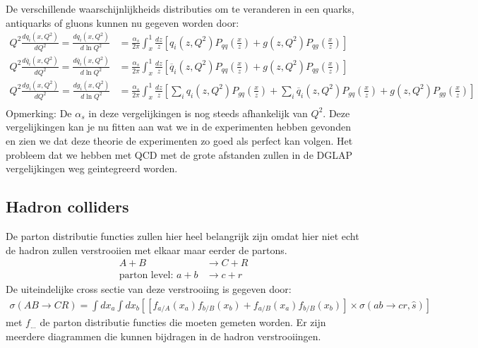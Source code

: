 \documentclass[../main.tex]{subfiles}
\begin{document}
De verschillende waarschijnlijkheids distributies om te veranderen in een  quarks, antiquarks of gluons kunnen nu gegeven worden door:
\begin{equation}
    \begin{aligned}
        \label{eq:dglap}
        Q^2 \frac{dq_i(x, Q^2)}{dQ^2} = \frac{dq_i(x,Q^2)}{d\ln Q^2} &= \frac{\alpha_s}{2\pi} \int_x^1 \frac{dz}{z} \left[ q_i(z,Q^2)P_{qq}\left( \frac{x}{z} \right) + g(z,Q^2)P_{qg} \left( \frac{x}{z} \right) \right]\\
        Q^2 \frac{d\overline q_i(x, Q^2)}{dQ^2} = \frac{d\overline q_i(x,Q^2)}{d\ln Q^2} &= \frac{\alpha_s}{2\pi} \int_x^1 \frac{dz}{z} \left[ \overline q_i(z,Q^2)P_{qq}\left( \frac{x}{z} \right) + g(z,Q^2)P_{qg} \left( \frac{x}{z} \right) \right]\\
        Q^2 \frac{dg_i(x, Q^2)}{dQ^2} = \frac{dg_i(x,Q^2)}{d\ln Q^2} &= \frac{\alpha_s}{2\pi} \int_x^1 \frac{dz}{z} \left[ \sum_i q_i(z,Q^2)P_{gq}\left( \frac{x}{z} \right) + \sum_i \overline q_i(z,Q^2)P_{gq}\left( \frac{x}{z} \right) + g(z,Q^2)P_{gg} \left( \frac{x}{z} \right) \right]\\
    \end{aligned}
\end{equation}
{\color{green} Opmerking: De $\alpha_s$ in deze vergelijkingen is nog steeds afhankelijk van $Q^2$.}
Deze vergelijkingen kan je nu fitten aan wat we in de experimenten hebben gevonden en zien we dat deze theorie de experimenten zo goed als perfect kan volgen. Het probleem dat we hebben met QCD met de grote afstanden zullen in de DGLAP vergelijkingen weg geintegreerd worden.

\subsection{Hadron colliders}%
\label{sub:hadron_colliders}

De parton distributie functies zullen hier heel belangrijk zijn omdat hier niet echt de hadron zullen verstrooiien met elkaar maar eerder de partons.
\begin{equation}
    \begin{aligned}
        \label{eq:hadr_coll}
        A+B &\rightarrow C + R\\
        \text{parton level: } a+b&\rightarrow c+r
    \end{aligned}
\end{equation}
De uiteindelijke cross sectie van deze verstrooiing is gegeven door:
\begin{equation}
    \begin{aligned}
        \label{eq:hadr_coll_cross_sec}
        \sigma(AB\rightarrow CR) = \int dx_a \int dx_b \left[ \left[ f_{a/A}(x_a) f_{b/B}(x_b) + f_{a/B}(x_a) f_{b/B}(x_b) \right] \times \sigma(ab\rightarrow cr,\hat s)\right]
    \end{aligned}
\end{equation}
met $f_{...}$ de parton distributie functies die moeten gemeten worden. Er zijn meerdere diagrammen die kunnen bijdragen in de hadron verstrooiingen.
\end{document}
